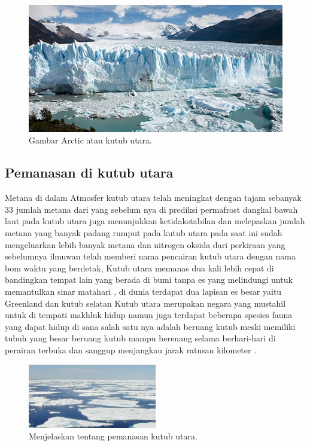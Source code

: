 \begin{figure}[ht]

\centerline{\includegraphics[width=.5\textwidth]{figures/arctic.jpg}}
\caption{Gambar Arctic atau kutub utara.}	

\label{Kutub_Utara}
\end{figure}
	
\subsection{Pemanasan di kutub utara}

		Metana di dalam Atmosfer kutub utara telah meningkat dengan tajam sebanyak 33%
	jumlah metana dari yang sebelum nya di prediksi permafrost dangkal bawah laut pada kutub utara juga menunjukkan ketidakstabilan dan melepaskan jumlah metana
	yang banyak padang rumput pada kutub utara pada saat ini sudah mengeluarkan lebih banyak metana dan nitrogen oksida dari perkiraan yang sebelumnya ilmuwan 
	telah memberi nama pencairan kutub utara dengan nama bom waktu yang berdetak, Kutub utara memanas dua kali lebih cepat di bandingkan tempat lain yang berada
	di bumi tanpa es yang melindungi untuk memantulkan sinar matahari , di dunia terdapat dua lapisan es besar yaitu Greenland dan kutub selatan Kutub utara merupakan
	negara yang mustahil untuk di tempati makhluk hidup namun juga terdapat beberapa spesies fauna yang dapat hidup di sana salah satu nya adalah beruang kutub
	meski memiliki tubuh yang besar beruang kutub mampu berenang selama berhari-hari di perairan terbuka dan sanggup menjangkau jarak ratusan kilometer .

\begin{figure}[ht]
\centerline{\includegraphics[width=0.5\textwidth]{figures/arctic1.pdf}}
\caption{Menjelaskan tentang pemanasan kutub utara.}	

\label{Pemanasan_Kutub_Utara}
\end{figure}




